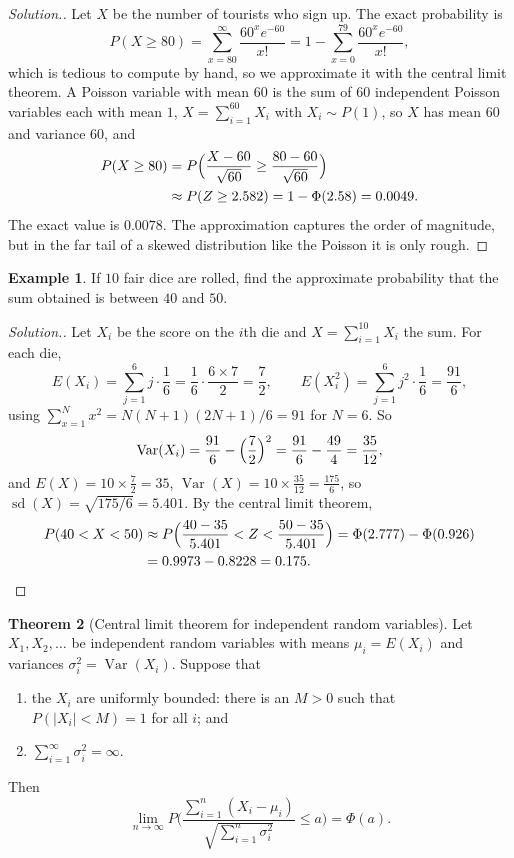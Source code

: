 \documentclass[11pt,a4paper]{article}
\theoremstyle{definition}
\newtheorem{thm}{Theorem}[subsection]
\newtheorem{exa}[thm]{Example}
\newenvironment{solution}
  {\renewcommand{\qedsymbol}{}\begin{proof}[\textit{Solution}.]}
  {\end{proof}}
\DeclareMathOperator{\Var}{Var}
\begin{document}
\begin{solution}
Let $X$ be the number of tourists who sign up. The exact probability is
\[
P(X \ge 80) = \sum_{x=80}^\infty\frac{60^xe^{-60}}{x!} = 1 - \sum_{x=0}^{79}\frac{60^xe^{-60}}{x!} ,
\]
which is tedious to compute by hand, so we approximate it with the central limit theorem. A Poisson variable with mean $60$ is the sum
of $60$ independent Poisson variables each with mean $1$, $X = \sum_{i=1}^{60}X_i$ with $X_i \sim P(1)$, so $X$ has mean $60$ and variance $60$, and
\begin{align*}
P(X \ge 80) &= P\Bigl(\frac{X - 60}{\sqrt{60}} \ge \frac{80 - 60}{\sqrt{60}}\Bigr) \\
&\approx P(Z \ge 2.582) = 1 - \Phi(2.58) = 0.0049 .
\end{align*}
The exact value is $0.0078$. The approximation captures the order of magnitude, but in the far tail of a skewed distribution like
the Poisson it is only rough.
\end{solution}

\begin{exa}\label{exa:dice}
If $10$ fair dice are rolled, find the approximate probability that the sum obtained is between $40$ and $50$.
\end{exa}

\begin{solution}
Let $X_i$ be the score on the $i$th die and $X = \sum_{i=1}^{10}X_i$ the sum. For each die,
\[
E(X_i) = \sum_{j=1}^6j\cdot\frac16 = \frac16\cdot\frac{6 \times 7}{2} = \frac72 , \qquad E(X_i^2) = \sum_{j=1}^6j^2\cdot\frac16 = \frac{91}{6} ,
\]
using $\sum_{x=1}^Nx^2 = N(N + 1)(2N + 1)/6 = 91$ for $N = 6$. So
\[
\Var(X_i) = \frac{91}{6} - \Bigl(\frac72\Bigr)^2 = \frac{91}{6} - \frac{49}{4} = \frac{35}{12} ,
\]
and $E(X) = 10 \times \frac72 = 35$, $\Var(X) = 10 \times \frac{35}{12} = \frac{175}{6}$, so $\operatorname{sd}(X) = \sqrt{175/6} = 5.401$. By the central limit theorem,
\begin{align*}
P(40 < X < 50) &\approx P\Bigl(\frac{40 - 35}{5.401} < Z < \frac{50 - 35}{5.401}\Bigr) = \Phi(2.777) - \Phi(0.926) \\
&= 0.9973 - 0.8228 = 0.175 .
\end{align*}
\end{solution}

\begin{thm}[Central limit theorem for independent random variables]\label{thm:clt-independent}
Let $X_1, X_2, \dots$ be independent random variables with means $\mu_i = E(X_i)$ and variances $\sigma_i^2 = \Var(X_i)$. Suppose that
\begin{enumerate}[label=(\alph*)]
\item the $X_i$ are uniformly bounded: there is an $M > 0$ such that $P(|X_i| < M) = 1$ for all $i$; and
\item $\sum_{i=1}^\infty\sigma_i^2 = \infty$.
\end{enumerate}
Then
\[
\lim_{n\to\infty}P\Biggl(\frac{\sum_{i=1}^n(X_i - \mu_i)}{\sqrt{\sum_{i=1}^n\sigma_i^2}} \le a\Biggr) = \Phi(a) .
\]
\end{thm}
\end{document}
